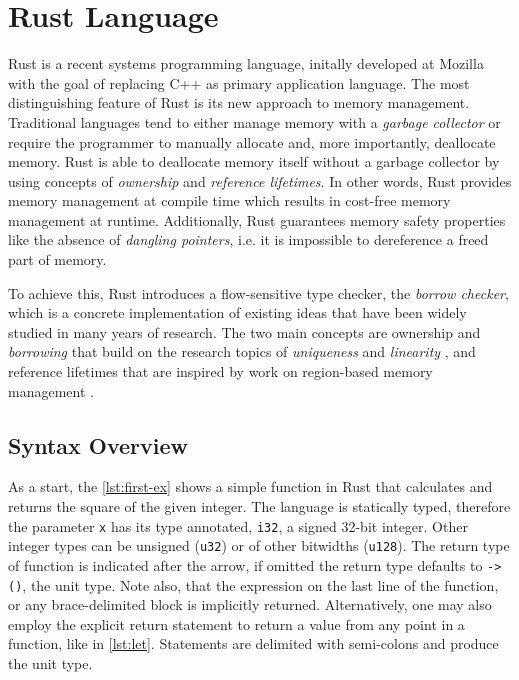 \section{Rust Language}

Rust \cite{rust2, rust1} is a recent systems programming language, initally
developed at Mozilla with the goal of replacing C++ as primary application
language. The most distinguishing feature of Rust is its new approach to memory
management. Traditional languages tend to either manage memory with a
\emph{garbage collector} or require the programmer to manually allocate and,
more importantly, deallocate memory. Rust is able to deallocate memory itself
without a garbage collector by using concepts of \emph{ownership} and
\emph{reference lifetimes}. In other words, Rust provides memory management at
compile time which results in cost-free memory management at runtime.
Additionally, Rust guarantees memory safety properties like  the absence of
\emph{dangling pointers}, i.e. it is impossible to dereference a freed part of
memory.

To achieve this, Rust introduces a flow-sensitive type checker, the \emph{borrow
checker}, which is a concrete implementation of existing ideas that have been
widely studied in many years of research. The two main concepts are ownership
\cite{ownership-types} and \emph{borrowing} that build on the research topics of
\emph{uniqueness} \cite{external-uniqueness, alias-burying} and \emph{linearity}
\cite{Wadler90lineartypes, once-upon-a-type, linear-haskell}, and reference
lifetimes that are inspired by work on region-based memory management
\cite{cyclone-region}.


\subsection{Syntax Overview}

As a start, the \autoref{lst:first-ex} shows a simple function in Rust that
calculates and returns the square of the given integer. The language is
statically typed, therefore the parameter \lstinline!x! has its type annotated,
\lstinline!i32!, a signed 32-bit integer. Other integer types can be unsigned
(\lstinline!u32!) or of other bitwidths (\lstinline!u128!). The return type of
function is indicated after the arrow, if omitted the return type defaults to
\lstinline!-> ()!, the unit type. Note also, that the expression on the last
line of the function, or any brace-delimited block is implicitly returned.
Alternatively, one may also employ the explicit return statement to return a
value from any point in a function, like in \autoref{lst:let}. Statements
are delimited with semi-colons and produce the unit type.

